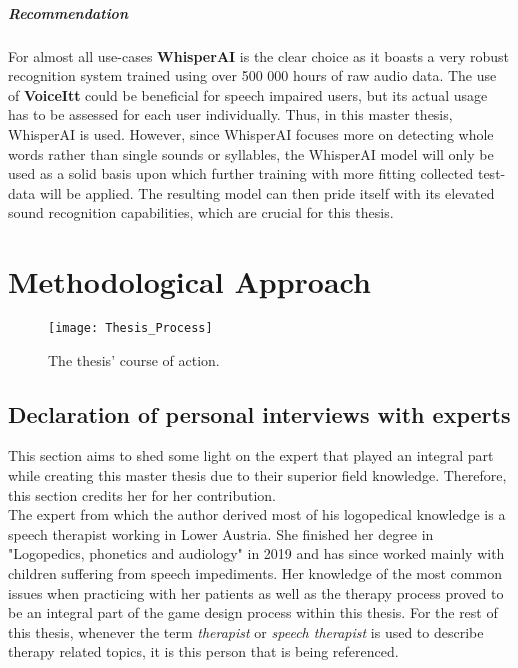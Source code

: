 \documentclass[draft,final]{vutinfth} %
\begin{document}
\paragraph{Recommendation} For almost all use-cases \textbf{WhisperAI} is the clear choice as it boasts a very robust recognition system trained using over 500 000 hours of raw audio data. The use of \textbf{VoiceItt} could be beneficial for speech impaired users, but its actual usage has to be assessed for each user individually. Thus, in this master thesis, WhisperAI is used. However, since WhisperAI focuses more on detecting whole words rather than single sounds or syllables, the WhisperAI model will only be used as a solid basis upon which further training with more fitting collected test-data will be applied. The resulting model can then pride itself with its elevated sound recognition capabilities, which are crucial for this thesis.

\chapter{Methodological Approach}
\label{chap:methodoloy}
\begin{figure}
\begin{center}
\texttt{[image: Thesis\_Process]}
\end{center}
\caption{The thesis' course of action.}
\end{figure}
\section{Declaration of personal interviews with experts}
This section aims to shed some light on the expert that played an integral part while creating this master thesis due to their superior field knowledge. Therefore, this section credits her for her contribution. \\

The expert from which the author derived most of his logopedical knowledge is a speech therapist working in Lower Austria. She finished her degree in "Logopedics, phonetics and audiology" in 2019 and has since worked mainly with children suffering from speech impediments. 
Her knowledge of the most common issues when practicing with her patients as well as the therapy process proved to be an integral part of the game design process within this thesis. For the rest of this thesis, whenever the term \emph{therapist} or \emph{speech therapist} is used to describe therapy related topics, it is this person that is being referenced.
\end{document}
